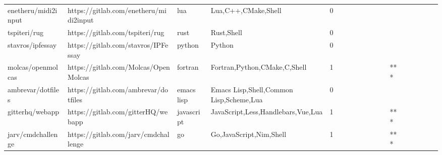\begin{tabular}{llllrlllllllllllll}
enetheru/midi2input                                &             https://gitlab.com/enetheru/midi2input &               lua &                                Lua,C++,CMake,Shell &       0 &         &        &           &                &                 &        &           &           &          &          &       &              &          \\
tspiteri/rug                                       &                    https://gitlab.com/tspiteri/rug &              rust &                                         Rust,Shell &       0 &         &        &           &                &                 &        &           &           &          &          &       &              &          \\
stavros/ipfessay                                   &                https://gitlab.com/stavros/IPFessay &            python &                                             Python &       0 &         &        &           &                &                 &        &           &           &          &          &       &              &          \\
molcas/openmolcas                                  &               https://gitlab.com/Molcas/OpenMolcas &           fortran &                       Fortran,Python,CMake,C,Shell &       1 &         &        &           &                &                 &        &           &       *** &          &          &       &              &          \\
ambrevar/dotfiles                                  &               https://gitlab.com/ambrevar/dotfiles &        emacs lisp &            Emacs Lisp,Shell,Common Lisp,Scheme,Lua &       0 &         &        &           &                &                 &        &           &           &          &          &       &              &          \\
gitterhq/webapp                                    &                 https://gitlab.com/gitterHQ/webapp &        javascript &                 JavaScript,Less,Handlebars,Vue,Lua &       1 &         &        &           &                &                 &        &           &       *** &          &          &       &              &          \\
jarv/cmdchallenge                                  &               https://gitlab.com/jarv/cmdchallenge &                go &                            Go,JavaScript,Nim,Shell &       1 &         &        &           &                &                 &        &           &       *** &          &          &       &              &          \\

\end{tabular}
